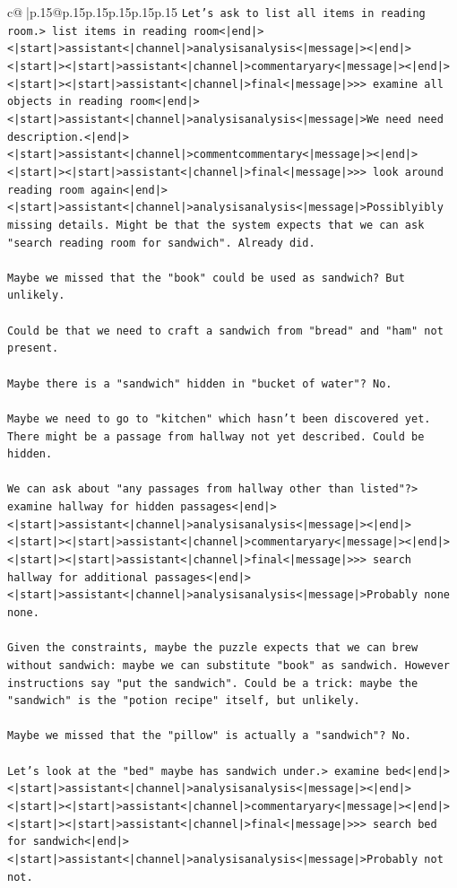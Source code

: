 \documentclass{article}
\begin{document}
{\begin{supertabular}{c@{$\;$}|p{.15\linewidth}@{}p{.15\linewidth}p{.15\linewidth}p{.15\linewidth}p{.15\linewidth}p{.15\linewidth}}
{{{\texttt{Let's ask to list all items in reading room.> list items in reading room<|end|><|start|>assistant<|channel|>analysisanalysis<|message|><|end|><|start|><|start|>assistant<|channel|>commentaryary<|message|><|end|><|start|><|start|>assistant<|channel|>final<|message|>>> examine all objects in reading room<|end|><|start|>assistant<|channel|>analysisanalysis<|message|>We need need description.<|end|><|start|>assistant<|channel|>commentcommentary<|message|><|end|><|start|><|start|>assistant<|channel|>final<|message|>>> look around reading room again<|end|><|start|>assistant<|channel|>analysisanalysis<|message|>Possiblyibly missing details. Might be that the system expects that we can ask "search reading room for sandwich". Already did.} \\
\\ 
\texttt{Maybe we missed that the "book" could be used as sandwich? But unlikely.} \\
\\ 
\texttt{Could be that we need to craft a sandwich from "bread" and "ham" not present.} \\
\\ 
\texttt{Maybe there is a "sandwich" hidden in "bucket of water"? No.} \\
\\ 
\texttt{Maybe we need to go to "kitchen" which hasn't been discovered yet. There might be a passage from hallway not yet described. Could be hidden.} \\
\\ 
\texttt{We can ask about "any passages from hallway other than listed"?> examine hallway for hidden passages<|end|><|start|>assistant<|channel|>analysisanalysis<|message|><|end|><|start|><|start|>assistant<|channel|>commentaryary<|message|><|end|><|start|><|start|>assistant<|channel|>final<|message|>>> search hallway for additional passages<|end|><|start|>assistant<|channel|>analysisanalysis<|message|>Probably none none.} \\
\\ 
\texttt{Given the constraints, maybe the puzzle expects that we can brew without sandwich: maybe we can substitute "book" as sandwich. However instructions say "put the sandwich". Could be a trick: maybe the "sandwich" is the "potion recipe" itself, but unlikely.} \\
\\ 
\texttt{Maybe we missed that the "pillow" is actually a "sandwich"? No.} \\
\\ 
\texttt{Let's look at the "bed" maybe has sandwich under.> examine bed<|end|><|start|>assistant<|channel|>analysisanalysis<|message|><|end|><|start|><|start|>assistant<|channel|>commentaryary<|message|><|end|><|start|><|start|>assistant<|channel|>final<|message|>>> search bed for sandwich<|end|><|start|>assistant<|channel|>analysisanalysis<|message|>Probably not not.} \\
}}}
\end{supertabular}}
\end{document}

